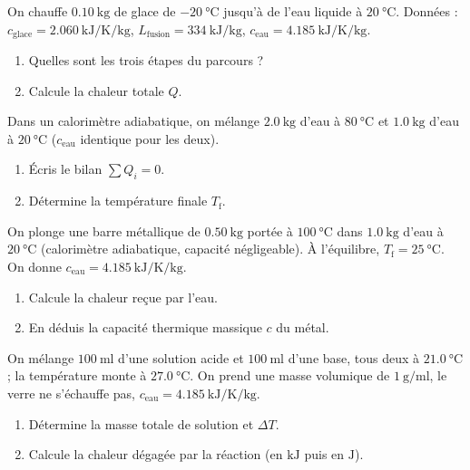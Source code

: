 \documentclass[11pt,a4paper]{article}
\begin{document}
\begin{exo}
On chauffe $\qty{0.10}{\kilogram}$ de glace de $\qty{-20}{\celsius}$ jusqu'à de l'eau liquide à $\qty{20}{\celsius}$. Données : $c_{\text{glace}}=\qty{2.060}{\kilo\joule\per\kelvin\per\kilogram}$, $L_{\text{fusion}}=\qty{334}{\kilo\joule\per\kilogram}$, $c_{\text{eau}}=\qty{4.185}{\kilo\joule\per\kelvin\per\kilogram}$.
\begin{enumerate}[label=\alph*)]
  \item Quelles sont les trois étapes du parcours ?
  \item Calcule la chaleur totale $Q$.
\end{enumerate}
\end{exo}

\begin{exo}
Dans un calorimètre adiabatique, on mélange $\qty{2.0}{\kilogram}$ d'eau à $\qty{80}{\celsius}$ et $\qty{1.0}{\kilogram}$ d'eau à $\qty{20}{\celsius}$ ($c_{\text{eau}}$ identique pour les deux).
\begin{enumerate}[label=\alph*)]
  \item Écris le bilan $\sum Q_i = 0$.
  \item Détermine la température finale $T_{\text{f}}$.
\end{enumerate}
\end{exo}

\begin{exo}
On plonge une barre métallique de $\qty{0.50}{\kilogram}$ portée à $\qty{100}{\celsius}$ dans $\qty{1.0}{\kilogram}$ d'eau à $\qty{20}{\celsius}$ (calorimètre adiabatique, capacité négligeable). À l'équilibre, $T_{\text{f}}=\qty{25}{\celsius}$. On donne $c_{\text{eau}}=\qty{4.185}{\kilo\joule\per\kelvin\per\kilogram}$.
\begin{enumerate}[label=\alph*)]
  \item Calcule la chaleur reçue par l'eau.
  \item En déduis la capacité thermique massique $c$ du métal.
\end{enumerate}
\end{exo}

\begin{exo}
On mélange $\qty{100}{\milli\litre}$ d'une solution acide et $\qty{100}{\milli\litre}$ d'une base, tous deux à $\qty{21.0}{\celsius}$ ; la température monte à $\qty{27.0}{\celsius}$. On prend une masse volumique de $\qty{1}{\gram\per\milli\litre}$, le verre ne s'échauffe pas, $c_{\text{eau}}=\qty{4.185}{\kilo\joule\per\kelvin\per\kilogram}$.
\begin{enumerate}[label=\alph*)]
  \item Détermine la masse totale de solution et $\Delta T$.
  \item Calcule la chaleur dégagée par la réaction (en $\si{\kilo\joule}$ puis en $\si{\joule}$).
\end{enumerate}
\end{exo}
\end{document}
